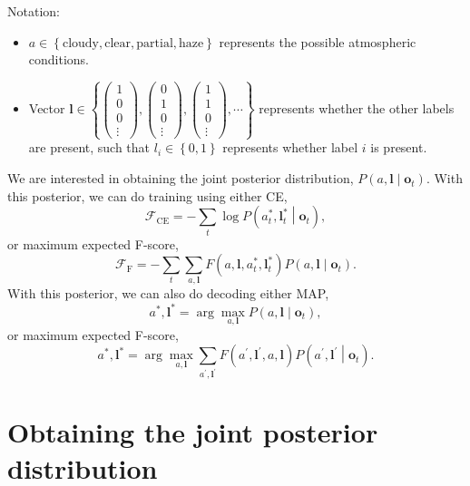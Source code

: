 \documentclass[11pt,a4paper]{article}
\title{}
\begin{document}
\maketitle

Notation:
\begin{itemize}
\item $a\in\left\{\text{cloudy},\text{clear},\text{partial},\text{haze}\right\}$ represents the possible atmospheric conditions.
\item Vector $\bm{l}\in\left\{\left(\begin{matrix}1\\0\\0\\\vdots\end{matrix}\right),\left(\begin{matrix}0\\1\\0\\\vdots\end{matrix}\right),\left(\begin{matrix}1\\1\\0\\\vdots\end{matrix}\right),\cdots\right\}$ represents whether the other labels are present, such that $l_i\in\left\{0,1\right\}$ represents whether label $i$ is present.
\end{itemize}

We are interested in obtaining the joint posterior distribution, $P\left(a,\bm{l}\middle|\bm{o}_t\right)$. With this posterior, we can do training using either CE,
\[
\mathcal{F}_\text{CE}=-\sum_t\log P\left(a_t^*,\bm{l}_t^*\middle|\bm{o}_t\right),
\]
or maximum expected F-score,
\[
\mathcal{F}_\text{F}=-\sum_t\sum_{a,\bm{l}}F\left(a,\bm{l},a_t^*,\bm{l}_t^*\right)P\left(a,\bm{l}\middle|\bm{o}_t\right).
\]
With this posterior, we can also do decoding either MAP,
\[
a^*,\bm{l}^*=\arg\max_{a,\bm{l}}P\left(a,\bm{l}\middle|\bm{o}_t\right),
\]
or maximum expected F-score,
\[
a^*,\bm{l}^*=\arg\max_{a,\bm{l}}\sum_{a^\prime,\bm{l}^\prime}F\left(a^\prime,\bm{l}^\prime,a,\bm{l}\right)P\left(a^\prime,\bm{l}^\prime\middle|\bm{o}_t\right).
\]

\section{Obtaining the joint posterior distribution}
\end{document}
